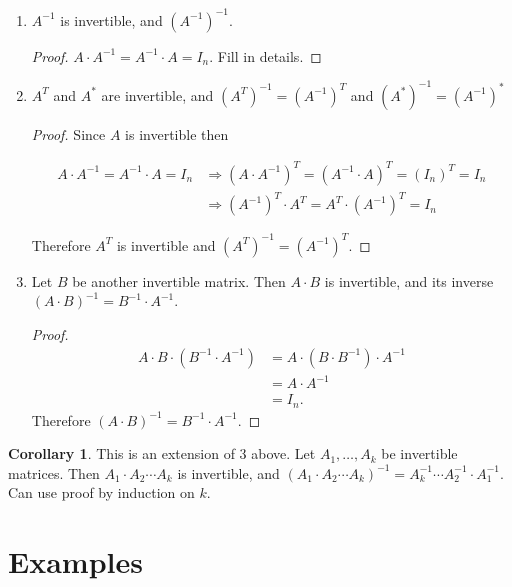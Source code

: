 \documentclass[12pt]{article}
\theoremstyle{definition}
\newtheorem*{corollary}{Corollary}
\begin{document}
\begin{enumerate}[label = (\arabic*)]

\item $A^{-1}$ is invertible, and $(A^{-1})^{-1}$.
\begin{proof}
$A \cdot A^{-1} = A^{-1} \cdot A = I_n$. Fill in details.
\end{proof}

\item $A^T$ and $A^*$ are invertible, and $(A^T)^{-1} = (A^{-1})^T$ and $(A^*)^{-1} = (A^{-1})^*$
\begin{proof}
Since $A$ is invertible then

\begin{align*}
A \cdot A^{-1} = A^{-1} \cdot A = I_n
&\Rightarrow (A \cdot A^{-1})^T = (A^{-1} \cdot A)^T = (I_n)^T = I_n \\
&\Rightarrow (A^{-1})^T \cdot A^T = A^T \cdot (A^{-1})^T = I_n
\end{align*}

Therefore $A^T$ is invertible and $(A^T)^{-1} = (A^{-1})^T$.
\end{proof}

\item Let $B$ be another invertible matrix. Then $A \cdot B$ is invertible, and its inverse
$(A \cdot B)^{-1} = B^{-1} \cdot A^{-1}$.
\begin{proof}
\begin{align*}
A \cdot B \cdot (B^{-1} \cdot A^{-1}) &= A \cdot (B \cdot B^{-1}) \cdot A^{-1} \\
&= A \cdot A^{-1} \\
&= I_n.
\end{align*}
Therefore $(A \cdot B)^{-1} = B^{-1} \cdot A^{-1}$.
\end{proof}
\end{enumerate}

\begin{corollary}
This is an extension of 3 above. Let $A_1, \ldots, A_k$ be invertible matrices. Then
$A_1 \cdot A_2 \cdots A_k$ is invertible, and 
$(A_1 \cdot A_2 \cdots A_k)^{-1} = A^{-1}_k \cdots A^{-1}_2 \cdot A^{-1}_1$. Can use
proof by induction on $k$.
\end{corollary}

\section{Examples}
\end{document}
